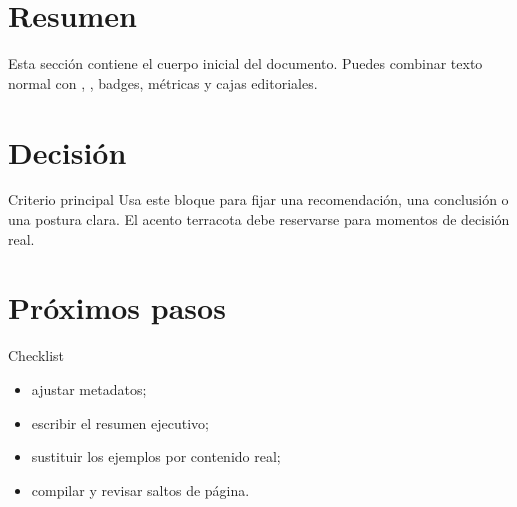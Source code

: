 \documentclass{claudeeditorial}
\renewcommand{\DocAuthor}{Tu Nombre}
\renewcommand{\DocRole}{Rol o equipo}
\begin{document}
\BodyCopy

\ClaudeCover

\begin{claudehero}
\end{claudehero}

\section{Resumen}

Esta sección contiene el cuerpo inicial del documento. Puedes combinar texto normal con , , badges, métricas y cajas editoriales.

\begin{tcbraster}[raster columns=3,raster equal height=rows,raster column skip=8pt]
\end{tcbraster}

\section{Decisión}

\begin{claudedecision}{Criterio principal}
Usa este bloque para fijar una recomendación, una conclusión o una postura clara. El acento terracota debe reservarse para momentos de decisión real.
\end{claudedecision}

\section{Próximos pasos}

\begin{claudechecklist}{Checklist}
\begin{itemize}
\item ajustar metadatos;
\item escribir el resumen ejecutivo;
\item sustituir los ejemplos por contenido real;
\item compilar y revisar saltos de página.
\end{itemize}
\end{claudechecklist}

\ClaudeSignature{\DocAuthor}{\DocRole}
\end{document}
